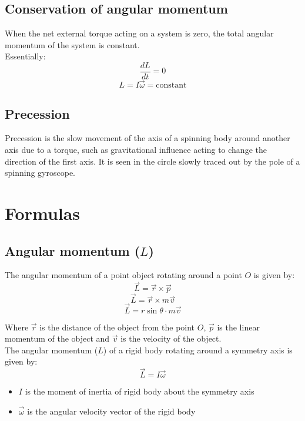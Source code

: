 \documentclass[11pt]{article}
\begin{document}
\newpage

\subsection{Conservation of angular momentum}
\label{sec:org5f4d8e7}
When the net external torque acting on a system is zero, the total angular momentum of the system is constant.
\\[0pt]

Essentially:
\[\frac{dL}{dt} = 0\]
\[L = I \vec{\omega} = \text{constant}\]

\subsection{Precession}
\label{sec:org9325996}
Precession is the slow movement of the axis of a spinning body around another axis due to a torque, such as gravitational influence acting to change the direction of the first axis. It is seen in the circle slowly traced out by the pole of a spinning gyroscope.


\section{Formulas}
\label{sec:org4ac18c8}

\subsection{Angular momentum (\(L\))}
\label{sec:org04f71ae}
The angular momentum of a point object rotating around a point \(O\) is given by:
\[\vec{L} = \vec{r} \times \vec{p}\]
\[\vec{L} = \vec{r} \times m \vec{v}\]
\[\vec{L} = r \sin \theta \cdot m \vec{v}\]

Where \(\vec{r}\) is the distance of the object from the point \(O\), \(\vec{p}\) is the linear momentum of the object and \(\vec{v}\) is the velocity of the object.
\\[0pt]

The angular momentum (\(L\)) of a rigid body rotating around a symmetry axis is given by:
\[\vec{L} = I \vec{\omega}\]

\begin{itemize}
\item \(I\) is the moment of inertia of rigid body about the symmetry axis
\item \(\vec{\omega}\) is the angular velocity vector of the rigid body
\end{itemize}
\end{document}
